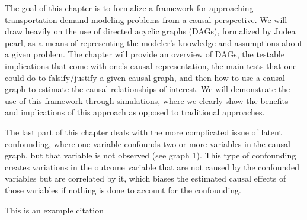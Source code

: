 The goal of this chapter is to formalize a framework for approaching 
transportation demand modeling problems from a causal perspective. We will 
draw heavily on the use of directed acyclic graphs (DAGs), formalized by Judea 
pearl, as a means of representing the modeler's knowledge and assumptions 
about a given problem. The chapter will provide an overview of DAGs, the 
testable implications that come with one's causal representation, the main 
tests that one could do to falsify/justify a given causal graph, and then how 
to use a causal graph to estimate the causal relationships of interest. We 
will demonstrate the use of this framework through simulations, where we 
clearly show the benefits and implications of this approach as opposed to 
traditional approaches. 


The last part of this chapter deals with the more complicated issue of latent 
confounding, where one variable confounds two or more variables in the causal 
graph, but that variable is not observed (see graph 1). This type of 
confounding creates variations in the outcome variable that are not caused by 
the confounded variables but are correlated by it, which biases the estimated 
causal effects of those variables if nothing is done to account for the 
confounding. 





\blindtext[2]

This is an example citation \cite{brathwaite_2018_causal}
